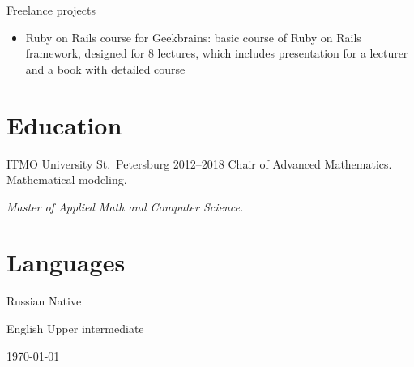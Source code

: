 \documentclass{cv}
\begin{document}
\begin{cvblock}{Freelance projects}
	\begin{itemize}
		\item Ruby on Rails course for Geekbrains:
		      basic course of Ruby on Rails framework, designed for 8 lectures, which
		      includes presentation for a lecturer and a book with detailed course
	\end{itemize}
\end{cvblock}

\section{Education}

\begin{cvblock}{%
		\blocktitle
		{ITMO University}
		{St.~Petersburg}
		{}
		{2012--2018}}
	Chair of Advanced Mathematics. Mathematical modeling.
	\vspace{1em}

	\textit{Master of Applied Math and Computer Science.}
\end{cvblock}

\section{Languages}

\begin{cvblock}{Russian}
	Native
\end{cvblock}

\begin{cvblock}{English}
	Upper intermediate
\end{cvblock}

\vfill

\begin{center}
	\monthyear\today
\end{center}
\end{document}
